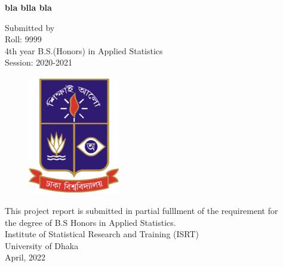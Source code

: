 \documentclass[
  12pt,
  oneside]{report}
\begin{document}
\newpage



\begin{center}
\huge{\textbf{bla blla bla}}\\

\vspace*{1.5\baselineskip}

\textbf\Large{{Submitted by}}\\
\vspace{2mm}
\Large{Roll: 9999\\
\vspace{2mm}
4th year B.S.(Honors) in Applied Statistics\\
\vspace{2mm}
Session: 2020-2021}\\

\vspace*{1.5\baselineskip}

\begin{figure}
  \centering
  \includegraphics[width=4cm, height=5.2cm]{../logo/du_logo_high.JPG}
\end{figure}


\vspace*{1.5\baselineskip}

\large{This project report is submitted in partial fulllment of the requirement for}\\
\large{the degree of B.S Honors in Applied Statistics.} \\
\vspace*{2\baselineskip}
\Large{Institute of Statistical Research and Training (ISRT) \\
University of Dhaka} \\
\Large{April, 2022}\\

\end{center}
\end{document}
